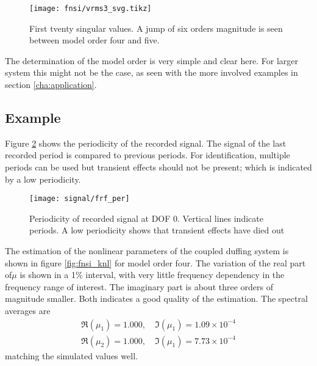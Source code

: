 \begin{figure}
  \centering
  \texttt{[image: fnsi/vrms3\_svg.tikz]}
  \caption{First tventy singular values. A jump of six orders magnitude is seen
    between model order four and five.}
  \label{fig:fnsi_svg}
\end{figure}

The determination of the model order is very simple and clear here. For larger system this
might not be the case, as seen with the more involved examples in section
\ref{cha:application}.

\subsection{Example}
\label{sec:fnsi_example}


Figure \ref{fig:periodicity} shows the periodicity of the recorded signal. The
signal of the last recorded period is compared to previous periods. For
identification, multiple periods can be used but transient effects should not be
present; which is indicated by a low periodicity.

\begin{figure}[!ht]
  \centering
  \texttt{[image: signal/frf\_per]}
  \caption{Periodicity of recorded signal at DOF 0. Vertical lines indicate
    periods. A low periodicity shows that transient effects have died out}
  \label{fig:periodicity}
\end{figure}


The estimation of the nonlinear parameters of the coupled duffing system is
shown in figure \ref{fig:fnsi_knl} for model order four. The variation of the
real part of$\mu$ is shown in a 1\% interval, with very little frequency
dependency in the frequency range of interest. The imaginary part is about three
orders of magnitude smaller. Both indicates a good quality of the estimation.
The spectral averages are
\begin{equation}
  \begin{aligned}
    \Re (\mu_1) = 1.000, \quad \Im (\mu_1) = 1.09 \times 10^{-4} \\
    \Re (\mu_2) = 1.000, \quad \Im (\mu_1) = 7.73 \times 10^{-4}
  \end{aligned}
\end{equation}
matching the simulated values well.

